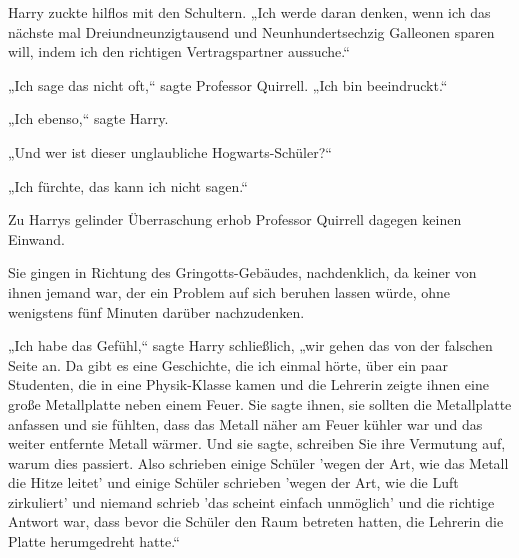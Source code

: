 Harry zuckte hilflos mit den Schultern. „Ich werde daran denken, wenn ich das nächste mal Dreiundneunzigtausend und Neunhundertsechzig Galleonen sparen will, indem ich den richtigen Vertragspartner aussuche.“

„Ich sage das nicht oft,“ sagte Professor Quirrell. „Ich bin beeindruckt.“

„Ich ebenso,“ sagte Harry.

„Und wer ist dieser unglaubliche Hogwarts-Schüler?“

„Ich fürchte, das kann ich nicht sagen.“

Zu Harrys gelinder Überraschung erhob Professor Quirrell dagegen keinen Einwand.

Sie gingen in Richtung des Gringotts-Gebäudes, nachdenklich, da keiner von ihnen jemand war, der ein Problem auf sich beruhen lassen würde, ohne wenigstens fünf Minuten darüber nachzudenken.

„Ich habe das Gefühl,“ sagte Harry schließlich, „wir gehen das von der falschen Seite an. Da gibt es eine Geschichte, die ich einmal hörte, über ein paar Studenten, die in eine Physik-Klasse kamen und die Lehrerin zeigte ihnen eine große Metallplatte neben einem Feuer. Sie sagte ihnen, sie sollten die Metallplatte anfassen und sie fühlten, dass das Metall näher am Feuer kühler war und das weiter entfernte Metall wärmer. Und sie sagte, schreiben Sie ihre Vermutung auf, warum dies passiert. Also schrieben einige Schüler 'wegen der Art, wie das Metall die Hitze leitet' und einige Schüler schrieben 'wegen der Art, wie die Luft zirkuliert' und niemand schrieb 'das scheint einfach unmöglich' und die richtige Antwort war, dass bevor die Schüler den Raum betreten hatten, die Lehrerin die Platte herumgedreht hatte.“

